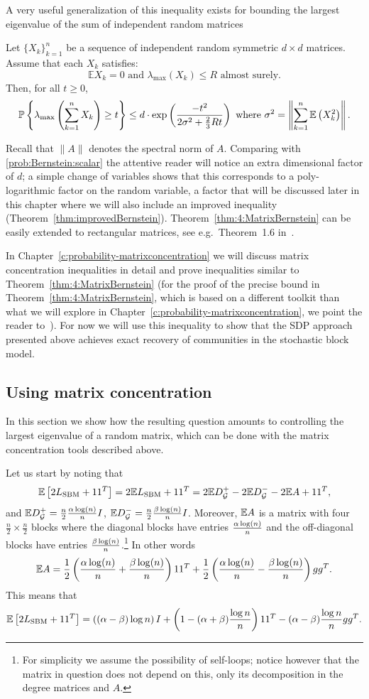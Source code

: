 A very useful generalization of this inequality exists for bounding the largest eigenvalue of the sum of independent random matrices
\begin{theorem}\label{thm:4:MatrixBernstein}
 Let $\{X_k\}_{k=1}^n$ be a sequence of independent random symmetric $d\times d$ matrices. Assume that each $X_k$ satisfies:
 \[
  \mathbb{E} X_k = 0 \text{ and } \lambda_{\max}\left( X_k \right) \leq R \text{ almost surely.}
 \]
Then, for all $t\geq 0$,
\[
 {\mathbb{P}}\left\{ \lambda_{\max}\left( \sum_{k=1}^n X_k \right) \geq t \right\} \leq d \cdot \exp\left( \frac{-t^2}{2\sigma^2 + \frac23Rt} \right) \text{ where } \sigma^2 = \left\| \sum_{k=1}^n\mathbb{E}\left(X_k^2\right) \right\|.
\]
\end{theorem}
Recall that $\|A\|$ denotes the spectral norm of $A$. Comparing with \eqref{prob:Bernstein:scalar} the attentive reader will notice an extra dimensional factor of $d$; a simple change of variables shows that this corresponds to a poly-logarithmic factor on the random variable, a factor that will be discussed later in this chapter where we will also include an improved inequality (Theorem~\ref{thm:improvedBernstein}).
Theorem~\ref{thm:4:MatrixBernstein} can be easily extended to rectangular matrices, see e.g.~Theorem~1.6 in~\cite{Tropp:TailBoundsRM}.


In Chapter~\ref{c:probability-matrixconcentration} we will discuss matrix concentration inequalities in detail and prove inequalities similar to Theorem~\ref{thm:4:MatrixBernstein} (for the proof of the precise bound in Theorem~\ref{thm:4:MatrixBernstein}, which is based on a different toolkit than what we will explore in Chapter~\ref{c:probability-matrixconcentration}, we point the reader to~\cite{Tropp:TailBoundsRM}). For now we will use this inequality to show that the SDP approach presented above achieves exact recovery of communities in the stochastic block model.


\subsection{Using matrix concentration}
In this section we show how the resulting question amounts to controlling the largest eigenvalue of a random matrix, which can be done with the matrix concentration tools described above.  


Let us start by noting that
\[
\mathbb{E}\left[ 2 L_{\text{SBM}} +11^T \right] = 2\mathbb{E} L_{\text{SBM}} +11^T = 2\mathbb{E} D_{\mathcal{G}}^+- 2\mathbb{E} D_{\mathcal{G}}^-- 2\mathbb{E} A  +11^T,
\]
and
$\mathbb{E} D_{\mathcal{G}}^+ = \frac{n}2 \frac{\alpha\log(n)}{n} I$, $\mathbb{E}D_{\mathcal{G}}^- = \frac{n}2 \frac{\beta\log(n)}{n} I$. Moreover, $\mathbb{E} A$ is a matrix with four $\frac{n}2\times \frac{n}2$ blocks where the diagonal blocks have entries $\frac{\alpha\log(n)}{n}$ and the off-diagonal blocks have entries $\frac{\beta\log(n)}{n}$.\footnote{For simplicity we assume the possibility of self-loops; notice however that the matrix in question does not depend on this, only its decomposition in the degree matrices and $A$.} In other words 
$$\mathbb{E} A = \frac12\left( \frac{\alpha\log(n)}{n} + \frac{\beta\log(n)}{n} \right)11^T +  \frac12\left( \frac{\alpha\log(n)}{n} - \frac{\beta\log(n)}{n} \right)   gg^T.$$
This means that
\[
\mathbb{E}\left[ 2 L_{\text{SBM}} +11^T \right] = \left( (\alpha-\beta) \log n\right)I  + \left( 1 - (\alpha+\beta)\frac{\log n}n \right)11^T - (\alpha-\beta)\frac{\log n}n gg^T.
\]

